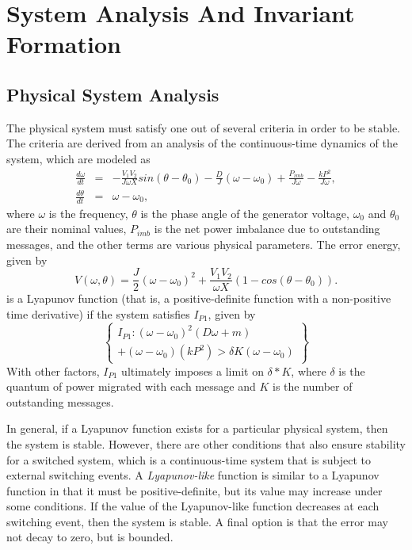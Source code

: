 \section{System Analysis And Invariant Formation}
\label{sec:invariants}

\subsection{Physical System Analysis}
The physical system must satisfy one out of several criteria in order to be
stable. The criteria are derived from an analysis of the continuous-time
dynamics of the system, which are modeled as
\begin{eqnarray}
  \frac{d\omega}{dt} &=& -\frac{V_1 V_2}{J \omega X}sin(\theta - \theta_0)-\frac{D}{J}(\omega - \omega_0) + \frac{P_{imb}}{J\omega} - \frac{kP^2}{J\omega}, \nonumber \\
  \frac{d\theta}{dt} &=& \omega - \omega_0,
  \label{eqn:swing1}
\end{eqnarray}
where $\omega$ is the frequency, $\theta$ is the phase angle of the generator voltage, $\omega_0$ and $\theta_0$ are their nominal
values, $P_{imb}$ is the net power imbalance due to outstanding messages,
and the other terms are various physical parameters.  The error energy, given by
\begin{equation}
  V(\omega, \theta) = \frac{J}{2} (\omega - \omega_0)^2 + \frac{V_1 V_2}{\omega X}(1-cos(\theta - \theta_0)).
  \label{eqn:lyap}
\end{equation}
is a Lyapunov function (that is, a positive-definite function with a
non-positive time derivative) if the system satisfies $I_{P1}$, given by
\begin{equation}
\left\{
\begin{matrix}
I_{P1}: (\omega - \omega_0)^2 \left(D\omega + m \right) \\ + (\omega - \omega_0)(kP^2)  > \delta K (\omega - \omega_0)
\end{matrix}
\right\}
\label{eqn:grid4}
\end{equation}
With other factors, $I_{P1}$ ultimately imposes a limit on $\delta * K$, where
$\delta$ is the quantum of power migrated with each message and $K$ is the
number of outstanding messages.

In general, if a Lyapunov function exists for a particular physical system, then
the system is stable. However, there are other conditions that also ensure
stability for a switched system, which is a continuous-time system that is
subject to external switching events. A \emph{Lyapunov-like} function
\cite{branicky98,ye98impulse,ye98hybrid} is similar to a Lyapunov function in
that it must be positive-definite, but its value may increase under some
conditions. If the value of the Lyapunov-like function decreases at each
switching event, then the system is stable. A final option is that the error may
not decay to zero, but is bounded.

